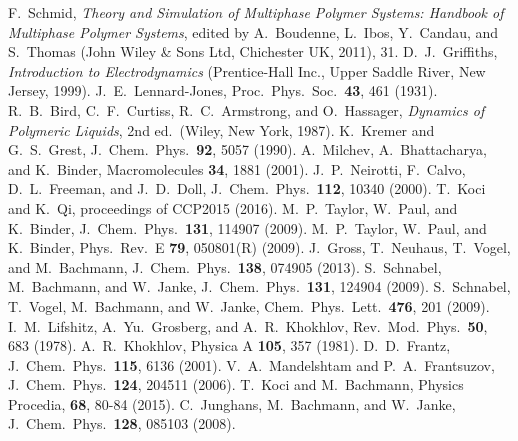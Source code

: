 F.~Schmid, \emph{Theory and Simulation of Multiphase Polymer Systems:
Handbook of Multiphase Polymer Systems}, edited by A.~Boudenne, L.~Ibos,
Y.~Candau, and S.~Thomas (John Wiley \& Sons Ltd, Chichester UK, 2011), 31.
%
D.~J.~Griffiths, \emph{Introduction to Electrodynamics} (Prentice-Hall Inc., Upper Saddle River, New Jersey, 1999).
%
%
J.~E.~Lennard-Jones, Proc.\ Phys.\ Soc.\  \textbf{43}, 461 (1931).
%
%
R.~B.\ Bird, C.~F.\ Curtiss, R.~C.\ Armstrong, and O.~Hassager,
\emph{Dynamics of Polymeric Liquids}, 2nd ed.\ (Wiley, New York,
1987).
%
K.~Kremer and G.~S.\ Grest, J.~Chem.\ Phys.\ \textbf{92}, 5057 (1990).
%
A.~Milchev, A.~Bhattacharya, and K.~Binder, Macromolecules \textbf{34},
1881 (2001).
%
J.~P.~Neirotti, F.~Calvo, D.~L.~Freeman, and J.~D.~Doll, J.~Chem.\ Phys.\ \textbf{112}, 10340 (2000).
%
T.~Koci and K.~Qi, proceedings of CCP2015 (2016).
%
%
%
M.~P.~Taylor, W.~Paul, and K.~Binder, J.~Chem.~Phys.\ \textbf{131}, 114907
(2009).
%
M.~P.~Taylor, W.~Paul, and K.~Binder, Phys.\ Rev.~E \textbf{79}, 050801(R)
(2009).
%
J.~Gross, T.~Neuhaus, T.~Vogel, and M.~Bachmann, J.~Chem.\ Phys.\
\textbf{138}, 074905 (2013).
%
%
S.~Schnabel, M.~Bachmann, and W.~Janke, J.~Chem.\ Phys.\ \textbf{131},
124904 (2009).
%
S.~Schnabel, T.~Vogel, M.~Bachmann, and W.~Janke, Chem.\ Phys.\ Lett.\
\textbf{476}, 201 (2009).
%
I.~M.\ Lifshitz, A.~Yu.\ Grosberg, and A.~R.\ Khokhlov, Rev.\ Mod.\
Phys.\ \textbf{50}, 683 (1978).
%
\bibitem{Khokhlov1981}
A.~R.\ Khokhlov, Physica A \textbf{105}, 357 (1981).
%
\bibitem{frantz}
D.~D.\ Frantz, J.~Chem.\ Phys.\ \textbf{115}, 
6136 (2001).
%
V.~A.\ Mandelshtam and P.~A.\ Frantsuzov, J.~Chem.\ Phys.\ \textbf{124}, 
204511 (2006).
%
%
T.~Koci and M.~Bachmann, Physics Procedia, \textbf{68}, 80-84 (2015).
%
\bibitem{Junghans2008}
C.~Junghans, M.~Bachmann, and W.~Janke, J.~Chem.\ Phys.\
\textbf{128}, 085103 (2008).	
